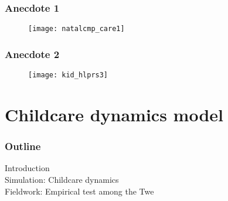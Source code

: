 \documentclass{beamer}
\newenvironment{graytext}{\color{gray}}{\ignorespacesafterend}
\begin{document}

\begin{frame}
\frametitle{Anecdote 1}
\begin{figure}
\texttt{[image: natalcmp\_care1]}
\end{figure}
\end{frame}


\begin{frame}
\frametitle{Anecdote 2}
\begin{figure}
\texttt{[image: kid\_hlprs3]}
\end{figure}
\end{frame}




\section{Childcare dynamics model}


\begin{frame}

\frametitle{Outline}

\begin{graytext}
Introduction \\
\end{graytext}
\vspace{0.75cm}
Simulation: Childcare dynamics \\
\vspace{0.75cm}
Fieldwork: Empirical test among the Twe

\end{frame}
\end{document}
